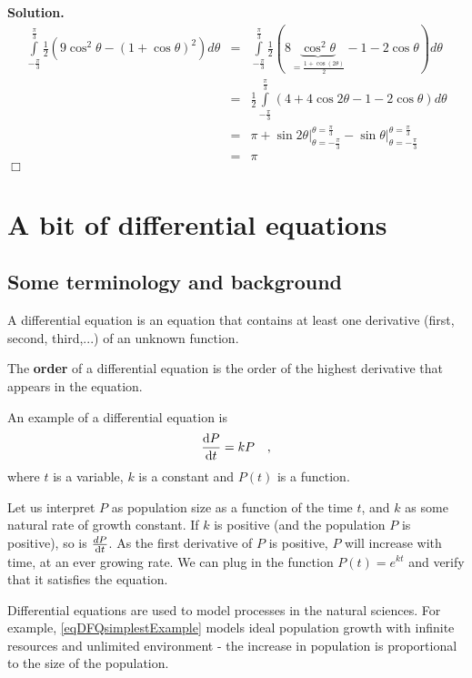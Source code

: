 \documentclass[12pt]{book}
\newenvironment{solution}{\medskip\noindent\textbf{Solution.} }{$\Box$}
\renewcommand{\emph}{\textbf}
\begin{document}
\begin{solution}
\[
\begin{array}{rcl}
\displaystyle\int\limits_{-\frac{\pi}{3}}^{\frac{\pi}{3}} \frac{1}2\left(9\cos^2\theta-(1+\cos\theta)^2\right) d\theta&=& \displaystyle\int\limits_{-\frac{\pi}{3}}^{\frac{\pi}{3}} \frac{1}2\left(8\underbrace{\cos^2\theta}_{=\frac{1+\cos(2\theta)}2  }-1-2\cos\theta \right) d\theta\\
&=&\displaystyle\frac{1}2\int\limits_{-\frac{\pi}{3}}^{\frac{\pi}{3}} \left(4+4 \cos 2\theta-1-2\cos\theta \right) d\theta
\\
&=&\pi+\left.\sin2\theta\right|_{\theta=-\frac{\pi}{3}}^{\theta=\frac{\pi}3}-\left.\sin\theta\right|_{\theta=-\frac{\pi}{3}}^{\theta=\frac{\pi}3}\\
&=&\pi
\end{array}
\]
\end{solution}


\chapter{A bit of differential equations}
\section{Some terminology and background}
A differential equation is an equation that contains at least one derivative (first, second, third,...) of an unknown function.

The \emph{order} of a differential equation is the order of the highest derivative that appears in the equation.

An example of a differential equation is
\begin{equation}\label{eqDFQsimplestExample}
\frac{{\normalfont \text{d}} P}{{\normalfont \text{d}} t} = k P\quad ,
\end{equation}
where $t$ is a variable, $k$ is a constant and $P(t)$ is a function.

Let us interpret $P$ as population size as a function of the time $t$, and $k$ as some natural rate of growth constant. If $k$ is positive (and the population $P$ is positive), so is $\frac{d P}{{\normalfont \text{d}} t}$. As the first derivative of $P$ is positive, $P$ will increase with time, at an ever growing rate. We can plug in the function $P(t)= e^{k t}$ and verify that it satisfies the equation.

Differential equations are used to model processes in the natural sciences. For example, \ref{eqDFQsimplestExample} models ideal population growth with infinite resources and unlimited environment - the increase in population is proportional to the size of the population.
\end{document}
